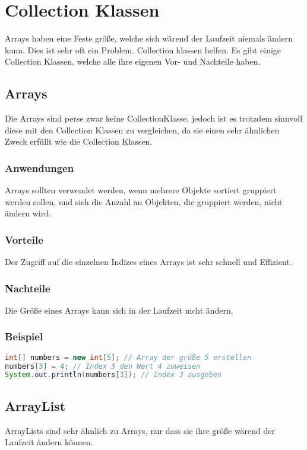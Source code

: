\chapter{Collection Klassen}
\label{chap:Collection Klassen}

Arrays haben eine Feste größe, welche sich wärend der Laufzeit niemals ändern kann. Dies ist sehr oft ein Problem. Collection klassen helfen. Es gibt einige Collection Klassen, welche alle ihre eigenen Vor- und Nachteile haben.

\section{Arrays}
Die Arrays sind perse zwar keine CollectionKlasse, jedoch ist es trotzdem sinnvoll diese mit den Collection Klassen zu vergleichen, da sie einen sehr ähnlichen Zweck erfüllt wie die Collection Klassen. 

\subsection{Anwendungen}
Arrays sollten verwendet werden, wenn mehrere Objekte sortiert gruppiert werden sollen, und sich die Anzahl an Objekten, die gruppiert werden, nicht ändern wird.

\subsection{Vorteile}
Der Zugriff auf die einzelnen Indizes eines Arrays ist sehr schnell und Effizient.

\subsection{Nachteile}
Die Größe eines Arrays kann sich in der Laufzeit nicht ändern.

\subsection{Beispiel}
\begin{lstlisting}[language=Java, caption={Beispiel für Arrays}]
int[] numbers = new int[5]; // Array der größe 5 erstellen
numbers[3] = 4; // Index 3 den Wert 4 zuweisen
System.out.println(numbers[3]); // Index 3 ausgeben
\end{lstlisting}

\section{ArrayList}
ArrayLists sind sehr ähnlich zu Arrays, nur dass sie ihre größe wärend der Laufzeit ändern können.

